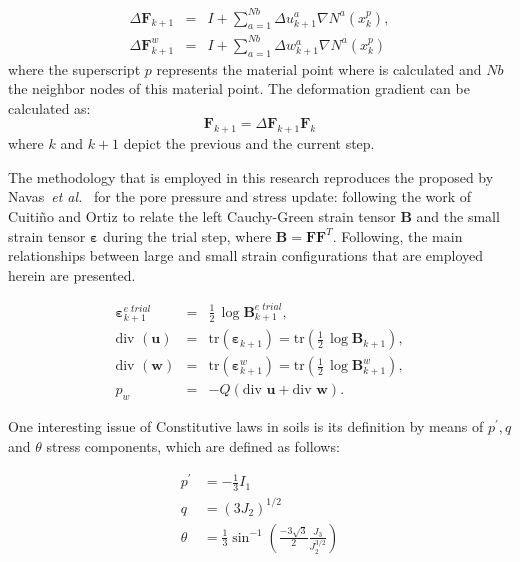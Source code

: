 \documentclass[preprint,12pt,a4paper]{elsarticle}
\begin{document}
\begin{eqnarray}
\Delta \mathbf{F}_{k+1} &=& I+\sum_{a=1}^{Nb}\Delta u_{k+1}^a \nabla N^a(x_{k}^p), \\
\Delta \mathbf{F}^w_{k+1} &=&I+\sum_{a=1}^{Nb}\Delta w_{k+1}^a \nabla N^a(x_{k}^p)
\end{eqnarray}
where the superscript $p$ represents the material point where is calculated and $Nb$ the neighbor nodes of this material point. The deformation gradient can be calculated as:
\begin{equation}
\mathbf{F}_{k+1} = \Delta \mathbf{F}_{k+1} \mathbf{F}_{k} 
\end{equation}
where $k$ and $k+1$ depict the previous and the current step.

The methodology that is employed in this research reproduces the proposed by Navas~\textit{et al.}~\cite{Navas:17c} for the pore pressure and stress update: following the work of Cuiti\~no and Ortiz \cite{cuitino:92} to relate the left Cauchy-Green strain tensor $\mathbf{B}$ and the small strain tensor $\boldsymbol{\varepsilon}$ during the trial step, where $\mathbf{B}=\mathbf{F}\mathbf{F}^T$. Following, the main relationships between large and small strain configurations that are employed herein are presented.

\begin{eqnarray}
\boldsymbol{\varepsilon}^{e\; trial}_{k+1} &=& \frac{1}{2}\,\log\mathbf{B}^{e\; trial}_{k+1},
\\
\mbox{div }(\boldsymbol{u}) &=& \mbox{tr}(\boldsymbol{\varepsilon}_{k+1})=\mbox{tr} \left (\frac{1}{2}\,\log\mathbf{B}_{k+1} \right), \\
\mbox{div }(\boldsymbol{w}) &=& \mbox{tr} (\boldsymbol{\varepsilon}^w_{k+1})=\mbox{tr} \left(\frac{1}{2}\,\log\mathbf{B}^w_{k+1} \right), \\
p_w&=&-Q \left( \mbox{div } \boldsymbol{u} + \mbox{div } \boldsymbol{w} \right).
\end{eqnarray}

One interesting issue of Constitutive laws in soils is its definition by means of \(p^{\prime}, q\) and \(\theta\) stress components, which
are defined as follows:

\begin{eqnarray}
p^{\prime} &=-\frac{1}{3} I_{1} \label{Eq1}\\ 
q &=\left(3 J_{2}\right)^{1 / 2} \label{Eq2}\\ 
\theta &=\frac{1}{3} \sin ^{-1}\left(\frac{-3 \sqrt{3}}{2} \frac{J_{3}}{J_{2}^{3 / 2}}\right)\label{Eq3}
\end{eqnarray}
\end{document}
